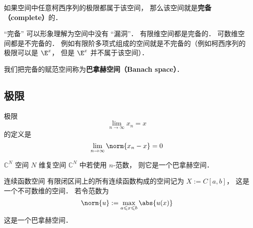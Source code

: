 

如果空间中任意柯西序列的极限都属于该空间， 那么该空间就是\textbf{完备（complete）}的．

“完备” 可以形象理解为空间中没有 “漏洞”． 有限维空间都是完备的． 可数维空间都是不完备的． 例如有限阶多项式组成的空间就是不完备的（例如柯西序列的极限可以是 $\E^x$， 但是 $\E^x$ 并不属于该空间）．

我们把完备的赋范空间称为\textbf{巴拿赫空间（Banach space）}．

\subsection{极限}
极限
\begin{equation}
\lim_{n\to\infty} x_n = x
\end{equation}
的定义是
\begin{equation}
\lim_{n\to\infty} \norm{x_n - x} = 0
\end{equation}

\begin{example}{$\mathbb C^N$ 空间}
$N$ 维复空间 $\mathbb C^N$ 中若使用 $n$-范数， 则它是一个巴拿赫空间．
\end{example}

\begin{example}{连续函数空间}
有限闭区间上的所有连续函数构成的空间记为 $X := C[a, b]$， 这是一个不可数维的空间． 若令范数为
\begin{equation}
\norm{u} := \max_{a \leqslant x \leqslant b} \abs{u(x)}
\end{equation}
这是一个巴拿赫空间．
\end{example}
